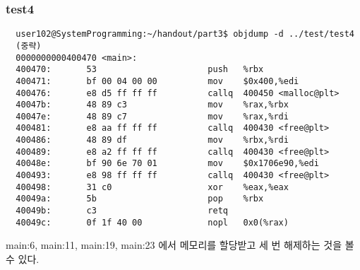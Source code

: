 \documentclass{report}
\begin{document}
\subsubsection{test4}
\begin{verbatim}
  user102@SystemProgramming:~/handout/part3$ objdump -d ../test/test4
  (중략)
  0000000000400470 <main>:
  400470:       53                      push   %rbx
  400471:       bf 00 04 00 00          mov    $0x400,%edi
  400476:       e8 d5 ff ff ff          callq  400450 <malloc@plt>
  40047b:       48 89 c3                mov    %rax,%rbx
  40047e:       48 89 c7                mov    %rax,%rdi
  400481:       e8 aa ff ff ff          callq  400430 <free@plt>
  400486:       48 89 df                mov    %rbx,%rdi
  400489:       e8 a2 ff ff ff          callq  400430 <free@plt>
  40048e:       bf 90 6e 70 01          mov    $0x1706e90,%edi
  400493:       e8 98 ff ff ff          callq  400430 <free@plt>
  400498:       31 c0                   xor    %eax,%eax
  40049a:       5b                      pop    %rbx
  40049b:       c3                      retq
  40049c:       0f 1f 40 00             nopl   0x0(%rax)
\end{verbatim}
main:6, main:11, main:19, main:23 에서 메모리를 할당받고 세 번 해제하는 것을 볼 수 있다.
\end{document}
